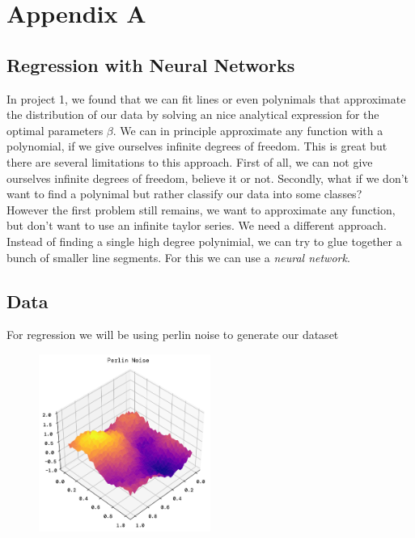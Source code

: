 \documentclass[twoside,11pt]{report}
\begin{document}


\clearpage 

\appendix
\renewcommand{\theHchapter}{appendix\Alph{chapter}}
\renewcommand{\theHsection}{appendix\thesection}

{}


\chapter*{Appendix A}
\label{app:appendixA}


\section{Regression with Neural Networks}
\label{sec:regression}

    In project 1\cite{MachineLearningProjects_2023}, we found that 
    we can fit lines or even polynimals that approximate the distribution of our data by solving an nice 
    analytical expression for the optimal parameters $\beta$. We can in principle approximate 
    any function with a polynomial, if we give ourselves infinite degrees of freedom. This is great but there are several
    limitations to this approach. First of all, we can not give ourselves infinite degrees of freedom, believe it or not.
    Secondly, what if we don't want to find a polynimal but rather classify our data into some classes?\\
    However the first problem
    still remains, we want to approximate any function, but don't want to use an infinite taylor series. 
    We need a different approach.
    Instead of finding a single high degree polynimial, we can try to glue together a bunch of smaller line segments.
    For this we can use a \emph{neural network}.


\section*{Data}

    For regression we will be using perlin noise to generate our dataset 

    \begin{figure}
        \begin{center}
            \includegraphics[width=0.5\textwidth]{../runsAndFigures/perlinNoise.png}
        \end{center}
        \caption{}\label{fig:perlin}
    \end{figure}
\end{document}
